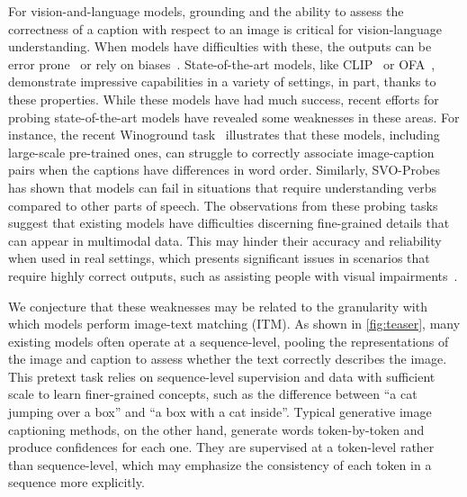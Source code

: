 \documentclass[10pt,twocolumn,letterpaper]{article}
\begin{document}
For vision-and-language models, grounding and the ability to assess the correctness of a caption with respect to an image is critical for vision-language understanding.
When models have difficulties with these, the outputs can be error prone~\cite{rohrbach2018emnlp} or rely on biases~\cite{agrawal2018vqacp,hendricks2018women}.
State-of-the-art models, like CLIP~\cite{radford2021learning} or OFA~\cite{wang2022unifying}, demonstrate impressive capabilities in a variety of settings, in part, thanks to these properties.
While these models have had much success, recent efforts for probing state-of-the-art models have revealed some weaknesses in these areas.
For instance, the recent Winoground task~\cite{thrush_and_ross2022winoground} illustrates that these models, including large-scale pre-trained ones, can struggle to correctly associate image-caption pairs when the captions have differences in word order.
Similarly, SVO-Probes~\cite{hendricks2021probing} has shown that models can fail in situations that require understanding verbs compared to other parts of speech.
The observations from these probing tasks suggest that existing models have difficulties discerning fine-grained details that can appear in multimodal data.
This may hinder their accuracy and reliability when used in real settings, which presents significant issues in scenarios that require highly correct outputs, such as assisting people with visual impairments~\cite{gurari2018vizwiz,whitehead2022reliable}.


We conjecture that these weaknesses may be related to the granularity with which models perform image-text matching (ITM).
As shown in \cref{fig:teaser}, many existing models often operate at a sequence-level, pooling the representations of the image and caption to assess whether the text correctly describes the image.
This pretext task relies on sequence-level supervision and data with sufficient scale to learn finer-grained concepts, such as the difference between ``a cat jumping over a box'' and ``a box with a cat inside''.
Typical generative image captioning methods, on the other hand, generate words token-by-token and produce confidences for each one.
They are supervised at a token-level rather than sequence-level, which may emphasize the consistency of each token in a sequence more explicitly.
\end{document}
